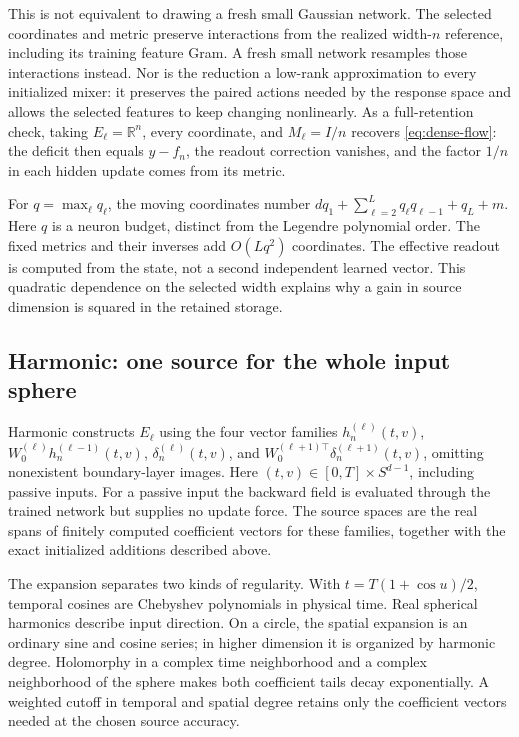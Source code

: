 This is not equivalent to drawing a fresh small Gaussian network.
The selected coordinates and metric preserve interactions from the
realized width-$n$ reference, including its training feature Gram. A fresh
small network resamples those interactions instead. Nor is the reduction
a low-rank approximation to every initialized mixer: it preserves the
paired actions needed by the response space and allows the selected
features to keep changing nonlinearly.
As a full-retention check, taking $E_\ell=\mathbb R^n$, every coordinate,
and $M_\ell=I/n$ recovers \eqref{eq:dense-flow}: the deficit
then equals $y-f_n$, the readout correction vanishes, and the factor $1/n$
in each hidden update comes from its metric.

For $q=\max_\ell q_\ell$, the moving coordinates number
$dq_1+\sum_{\ell=2}^Lq_\ell q_{\ell-1}+q_L+m$.
Here $q$ is a neuron budget, distinct from the Legendre polynomial order.
The fixed metrics and their inverses add $O(Lq^2)$ coordinates. The
effective readout is computed from the state, not a second independent
learned vector. This quadratic dependence on the selected width explains
why a gain in source dimension is squared in the retained storage.

\subsection{Harmonic: one source for the whole input sphere}
\label{sec:harmonic-method}

Harmonic constructs $E_\ell$ using the four vector families
$h_n^{(\ell)}(t,v)$,
$W_0^{(\ell)}h_n^{(\ell-1)}(t,v)$,
$\delta_n^{(\ell)}(t,v)$, and
$W_0^{(\ell+1)\top}\delta_n^{(\ell+1)}(t,v)$,
omitting nonexistent boundary-layer images. Here
$(t,v)\in[0,T]\times S^{d-1}$, including passive inputs.
For a passive input the backward field is evaluated through the trained
network but supplies no update force. The source spaces are the real spans
of finitely computed coefficient vectors for these families, together with
the exact initialized additions described above.

The expansion separates two kinds of regularity. With
$t=T(1+\cos u)/2$, temporal cosines are Chebyshev polynomials in physical
time. Real spherical harmonics describe input direction. On a circle, the
spatial expansion is an ordinary sine and cosine series; in higher
dimension it is organized by harmonic degree. Holomorphy in a complex
time neighborhood and a complex neighborhood of the sphere makes both
coefficient tails decay exponentially. A weighted cutoff in temporal and
spatial degree retains only the coefficient vectors needed at the chosen
source accuracy.


